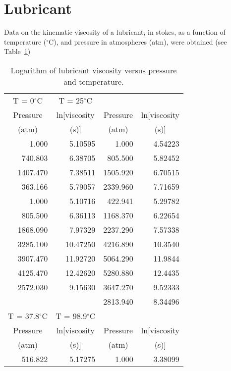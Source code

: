 \section{Lubricant}

Data on the kinematic viscosity of a lubricant, in stokes, as a
function of temperature ($^\circ$C), and pressure in atmospheres (atm),
were obtained (see Table~\ref{atbl:lub})
\begin{table}
  \caption{\label{atbl:lub}
  Logarithm of lubricant viscosity versus pressure and temperature.}
  \begin{center}
    \begin{tabular}{r r r r}\hline
      \multicolumn{1}{c}{T = 0$^\circ$C}&\multicolumn{1}{c}{T = 25$^\circ$C}\\
      \multicolumn{1}{c}{Pressure}&\multicolumn{1}{c}{ln[viscosity}&
      \multicolumn{1}{c}{Pressure}&\multicolumn{1}{c}{ln[viscosity}\\
      \multicolumn{1}{c}{(atm)}&\multicolumn{1}{c}{(s)]}&
      \multicolumn{1}{c}{(atm)}&\multicolumn{1}{c}{(s)]}\\
      \hline
      1.000&5.10595&1.000&4.54223\\
      740.803&6.38705&805.500&5.82452\\
      1407.470&7.38511&1505.920&6.70515\\
      363.166&5.79057&2339.960&7.71659\\
      1.000&5.10716&422.941&5.29782\\
      805.500&6.36113&1168.370&6.22654\\
      1868.090&7.97329&2237.290&7.57338\\
      3285.100&10.47250&4216.890&10.3540\\
      3907.470&11.92720&5064.290&11.9844\\
      4125.470&12.42620&5280.880&12.4435\\
      2572.030&9.15630&3647.270&9.52333\\
      &&2813.940&8.34496\\
      \hline
      \multicolumn{1}{c}{T = 37.8$^\circ$C}&\multicolumn{1}{c}{T = 98.9$^\circ$C}\\
      \multicolumn{1}{c}{Pressure}&\multicolumn{1}{c}{ln[viscosity}&
      \multicolumn{1}{c}{Pressure}&\multicolumn{1}{c}{ln[viscosity}\\
      \multicolumn{1}{c}{(atm)}&\multicolumn{1}{c}{(s)]}&
      \multicolumn{1}{c}{(atm)}&\multicolumn{1}{c}{(s)]}\\
      \hline
      516.822&5.17275&1.000&3.38099\\

\end{tabular}
\end{center}
\end{table}
